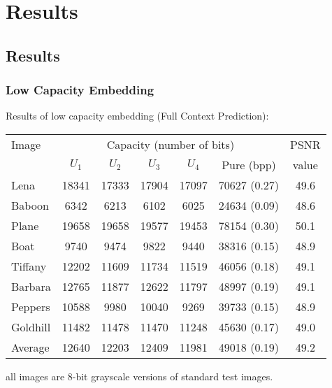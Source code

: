 \documentclass[slidestop,compress]{beamer}
\begin{document}
\section{Results}
\subsection*{Results }
\begin{frame}
\frametitle{Low Capacity Embedding }
    Results of low capacity embedding (Full Context Prediction): \\
    \begin{table}
      \setlength{\tabcolsep}{1.2mm}
      \begin{tabular}{lcccccc} \hline
	Image & \multicolumn{5}{c}{Capacity (number of bits)} & PSNR\\ 
	 & $U_1$ & $U_2$ & $U_3$ & $U_4$ & Pure (bpp) & value  \\ \hline\hline
	Lena 	& 18341	& 17333	& 17904	& 17097	& 70627 (0.27) & 49.6 \\
	Baboon	& 6342	& 6213	& 6102	& 6025	& 24634 (0.09) & 48.6 \\
	Plane 	& 19658	& 19658	& 19577	& 19453	& 78154 (0.30) & 50.1 \\
	Boat	& 9740	& 9474	& 9822	& 9440	& 38316	(0.15) & 48.9 \\
	Tiffany 	& 12202 & 11609 & 11734 & 11519 & 46056 (0.18) & 49.1 \\
	Barbara	& 12765	& 11877 & 12622 & 11797 & 48997 (0.19) & 49.1 \\
	Peppers	& 10588 & 9980 	& 10040 & 9269 	& 39733 (0.15) & 48.9 \\
	Goldhill	& 11482	& 11478	& 11470	& 11248	& 45630 (0.17) & 49.0 \\ 
	Average	& 12640	& 12203 & 12409 & 11981 & 49018 (0.19) & 49.2 \\ \hline
      \end{tabular}
    \end{table}
    \tiny{all images are 8-bit grayscale versions of standard test images.}
\end{frame}
\end{document}
